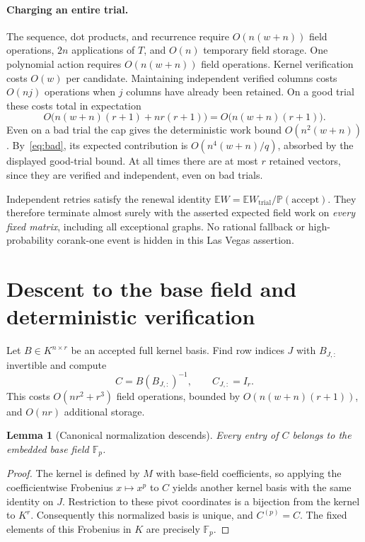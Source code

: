 \documentclass[11pt]{article}
\newtheorem{lemma}[theorem]{Lemma}
\newcommand{\F}{\mathbb F}
\newcommand{\E}{\mathbb E}
\newcommand{\Prob}{\mathbb P}
\begin{document}
\paragraph{Charging an entire trial.}
The sequence, dot products, and recurrence require
$O(n(w+n))$ field operations, $2n$ applications of $T$, and
$O(n)$ temporary field storage. One polynomial action requires
$O(n(w+n))$ field operations. Kernel verification costs $O(w)$
per candidate. Maintaining independent verified columns costs
$O(nj)$ operations when $j$ columns have already been retained.
On a good trial these costs total in expectation
\[
 O\bigl(n(w+n)(r+1)+nr(r+1)\bigr)
 =O\bigl(n(w+n)(r+1)\bigr).
\]
Even on a bad trial the cap gives the deterministic work bound
$O(n^2(w+n))$. By~\eqref{eq:bad}, its expected contribution is
$O(n^4(w+n)/q)$, absorbed by the displayed good-trial bound.
At all times there are at most $r$ retained vectors, since they
are verified and independent, even on bad trials.

Independent retries satisfy the renewal identity
$\E W=\E W_{\mathrm{trial}}/\Prob(\mathrm{accept})$.
They therefore terminate almost surely with the asserted expected
field work on \emph{every fixed matrix}, including all exceptional
graphs. No rational fallback or high-probability corank-one event
is hidden in this Las Vegas assertion.

\section{Descent to the base field and deterministic verification}
Let $B\in K^{n\times r}$ be an accepted full kernel basis.
Find row indices $J$ with $B_{J,:}$ invertible and compute
\[
 C=B(B_{J,:})^{-1},\qquad C_{J,:}=I_r.
\]
This costs $O(nr^2+r^3)$ field operations, bounded by
$O(n(w+n)(r+1))$, and $O(nr)$ additional storage.

\begin{lemma}[Canonical normalization descends]\label{lem:descent}
Every entry of $C$ belongs to the embedded base field $\F_p$.
\end{lemma}
\begin{proof}
The kernel is defined by $M$ with base-field coefficients, so applying
the coefficientwise Frobenius $x\mapsto x^p$ to $C$ yields another
kernel basis with the same identity on $J$. Restriction to these
pivot coordinates is a bijection from the kernel to $K^r$.
Consequently this normalized basis is unique, and $C^{(p)}=C$.
The fixed elements of this Frobenius in $K$ are precisely $\F_p$.
\end{proof}
\end{document}
